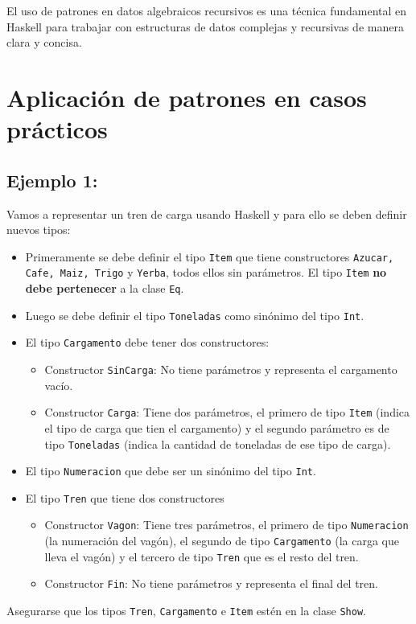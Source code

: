 \documentclass{article}
\begin{document}
El uso de patrones en datos algebraicos recursivos es una técnica fundamental en Haskell para trabajar con estructuras de datos complejas y recursivas de manera clara y concisa.

\newpage
\section{Aplicación de patrones en casos prácticos}

\subsection{Ejemplo 1:}
Vamos a representar un tren de carga usando Haskell y para ello se deben definir nuevos tipos:
\begin{itemize}
    \item Primeramente se debe definir el tipo \texttt{Item} que tiene constructores \texttt{Azucar, Cafe, Maiz, Trigo} y \texttt{Yerba}, todos ellos sin parámetros. El tipo \texttt{Item} \textbf{no debe pertenecer} a la clase \texttt{Eq}.
    \item Luego se debe definir el tipo \texttt{Toneladas} como sinónimo del tipo \texttt{Int}.
    \item El tipo \texttt{Cargamento} debe tener dos constructores:
        \begin{itemize}
            \item Constructor \texttt{SinCarga}: No tiene parámetros y representa el cargamento vacío.
            \item Constructor \texttt{Carga}: Tiene dos parámetros, el primero de tipo \texttt{Item} (indica el tipo de carga que tien el cargamento) y el segundo parámetro es de tipo \texttt{Toneladas} (indica la cantidad de toneladas de ese tipo de carga).
        \end{itemize}
    \item El tipo \texttt{Numeracion} que debe ser un sinónimo del tipo \texttt{Int}.
    \item El tipo \texttt{Tren} que tiene dos constructores
        \begin{itemize}
            \item Constructor \texttt{Vagon}: Tiene tres parámetros, el primero de tipo \texttt{Numeracion} (la numeración del vagón), el segundo de tipo \texttt{Cargamento} (la carga que lleva el vagón) y el tercero de tipo \texttt{Tren} que es el resto del tren.
            \item Constructor \texttt{Fin}: No tiene parámetros y representa el final del tren.
        \end{itemize}
\end{itemize}
Asegurarse que los tipos \texttt{Tren}, \texttt{Cargamento} e \texttt{Item} estén en la clase \texttt{Show}.
\end{document}
